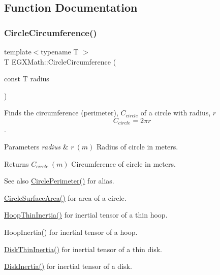 \subsection{Function Documentation}
\mbox{\label{group___e_g_x_math-_geometry-2_d-_circle_gadb55695b75a06a3f3534494eb767e18e}} 
\subsubsection{\texorpdfstring{Circle\+Circumference()}{CircleCircumference()}}
{\footnotesize\ttfamily template$<$typename T $>$ \\
T E\+G\+X\+Math\+::\+Circle\+Circumference (\begin{DoxyParamCaption}\item[{const T}]{radius }\end{DoxyParamCaption})}



Finds the circumference (perimeter), $C_{circle}$ of a circle with radius, $r$ \[ C_{circle}=2 \pi r \]. 


\begin{DoxyParams}{Parameters}
{\em radius} & $ r\ (m)$ Radius of circle in meters. \\
\hline
\end{DoxyParams}
\begin{DoxyReturn}{Returns}
$ C_{circle}\ (m)$ Circumference of circle in meters. 
\end{DoxyReturn}
\begin{DoxySeeAlso}{See also}
\mbox{\hyperlink{group___e_g_x_math-_geometry-2_d-_circle_gad32d0bded2e74c52a4c41cfffd2a9e77}{Circle\+Perimeter()}} for alias. 

\mbox{\hyperlink{group___e_g_x_math-_geometry-2_d-_circle_gaa4486100a643c57bd7a80c1c11ae3f60}{Circle\+Surface\+Area()}} for area of a circle. 

\mbox{\hyperlink{group___e_g_x_math-_geometry-3_d-_hoop_gab3a84dc2aa29ce0db990425747d291c6}{Hoop\+Thin\+Inertia()}} for inertial tensor of a thin hoop. 

Hoop\+Inertia() for inertial tensor of a hoop. 

\mbox{\hyperlink{group___e_g_x_math-_geometry-3_d-_disk_ga8dcadf6cd5680294a84311c6767e3caf}{Disk\+Thin\+Inertia()}} for inertial tensor of a thin disk. 

\mbox{\hyperlink{group___e_g_x_math-_geometry-3_d-_disk_ga6ed461694b277e36a641a6550bdea68f}{Disk\+Inertia()}} for inertial tensor of a disk. 
\end{DoxySeeAlso}
\mbox{\label{group___e_g_x_math-_geometry-2_d-_circle_gad32d0bded2e74c52a4c41cfffd2a9e77}} 
